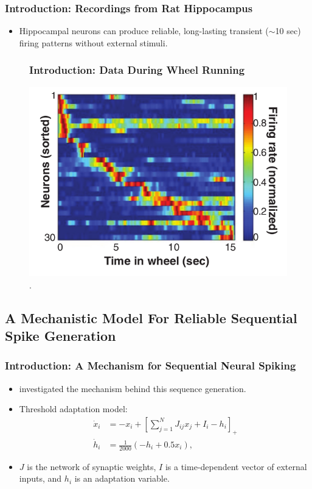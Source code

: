 \documentclass{beamer}
\begin{document}
\begin{frame}
\frametitle{Introduction: Recordings from Rat Hippocampus}
 \vspace{-.1in}
\begin{itemize}
 \item Hippocampal neurons can produce reliable, long-lasting transient ($\sim$10 sec) firing patterns without external stimuli.
\end{itemize}
\begin{figure}
\frametitle{Introduction: Data During Wheel Running}
 \includegraphics[width=.65\textwidth]{neural_activity2.png}
 \vspace{-.1in}
 \caption{\cite{PastalkovaItskovAmarasinghamBuzski:2008:Science}.}
\end{figure}
\end{frame}

\subsection{A Mechanistic Model For Reliable Sequential Spike Generation}
\begin{frame}
\frametitle{Introduction: A Mechanism for Sequential Neural Spiking}
\begin{itemize}
 \item \cite{itskov_2011_cell} investigated the mechanism behind this sequence generation.
 \item Threshold adaptation model:
\begin{equation*}
\begin{split}
 \dot x_i &= -x_i + \left[ \sum_{j=1}^N J_{ij} x_j + I_i - h_i \right]_+\\
 \dot h_i &= \frac{1}{2000}(-h_i + 0.5 x_i),
\end{split}
\end{equation*}
\item $J$ is the network of synaptic weights, $I$ is a time-dependent vector of external inputs, and $h_i$ is an adaptation variable.
\end{itemize}
\end{frame}
\end{document}
